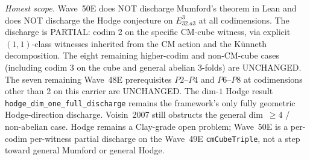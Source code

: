 \begin{remark}
\emph{Honest scope.} Wave~50E does NOT discharge Mumford's theorem in Lean and does NOT discharge the Hodge conjecture on $E_{32.a3}^3$ at all codimensions. The discharge is PARTIAL: codim 2 on the specific CM-cube witness, via explicit $(1, 1)$-class witnesses inherited from the CM action and the K\"unneth decomposition. The eight remaining higher-codim and non-CM-cube cases (including codim 3 on the cube and general abelian 3-folds) are UNCHANGED. The seven remaining Wave~48E prerequisites $P2$--$P4$ and $P6$--$P8$ at codimensions other than 2 on this carrier are UNCHANGED. The dim-$1$ Hodge result \texttt{hodge\_dim\_one\_full\_discharge} remains the framework's only fully geometric Hodge-direction discharge. Voisin~2007 still obstructs the general dim~$\geq 4$ / non-abelian case. Hodge remains a Clay-grade open problem; Wave~50E is a per-codim per-witness partial discharge on the Wave~49E \texttt{cmCubeTriple}, not a step toward general Mumford or general Hodge.
\end{remark}

